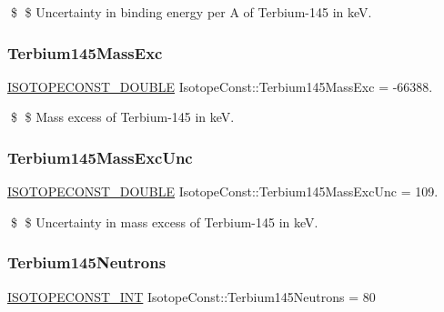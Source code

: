 \$ \$ Uncertainty in binding energy per A of Terbium-\/145 in keV. \mbox{\label{group___isotope_const-_terbium-_tb145_ga8f033d6076bd7de230d8d8d1eb06375a}} 
\subsubsection{\texorpdfstring{Terbium145\+Mass\+Exc}{Terbium145MassExc}}
{\footnotesize\ttfamily \mbox{\hyperlink{group___isotope_const-_macros_ga8f45a7272ce02c0b4c65c44636ed719a}{I\+S\+O\+T\+O\+P\+E\+C\+O\+N\+S\+T\+\_\+\+D\+O\+U\+B\+LE}} Isotope\+Const\+::\+Terbium145\+Mass\+Exc = -\/66388.}

\$ \$ Mass excess of Terbium-\/145 in keV. \mbox{\label{group___isotope_const-_terbium-_tb145_ga0082abf4e7494f2df2379216e4b471fd}} 
\subsubsection{\texorpdfstring{Terbium145\+Mass\+Exc\+Unc}{Terbium145MassExcUnc}}
{\footnotesize\ttfamily \mbox{\hyperlink{group___isotope_const-_macros_ga8f45a7272ce02c0b4c65c44636ed719a}{I\+S\+O\+T\+O\+P\+E\+C\+O\+N\+S\+T\+\_\+\+D\+O\+U\+B\+LE}} Isotope\+Const\+::\+Terbium145\+Mass\+Exc\+Unc = 109.}

\$ \$ Uncertainty in mass excess of Terbium-\/145 in keV. \mbox{\label{group___isotope_const-_terbium-_tb145_ga3357e262f18247bed7b770c10f4c71e3}} 
\subsubsection{\texorpdfstring{Terbium145\+Neutrons}{Terbium145Neutrons}}
{\footnotesize\ttfamily \mbox{\hyperlink{group___isotope_const-_macros_ga5f18360b3e99483a35c32d789e62621c}{I\+S\+O\+T\+O\+P\+E\+C\+O\+N\+S\+T\+\_\+\+I\+NT}} Isotope\+Const\+::\+Terbium145\+Neutrons = 80}

